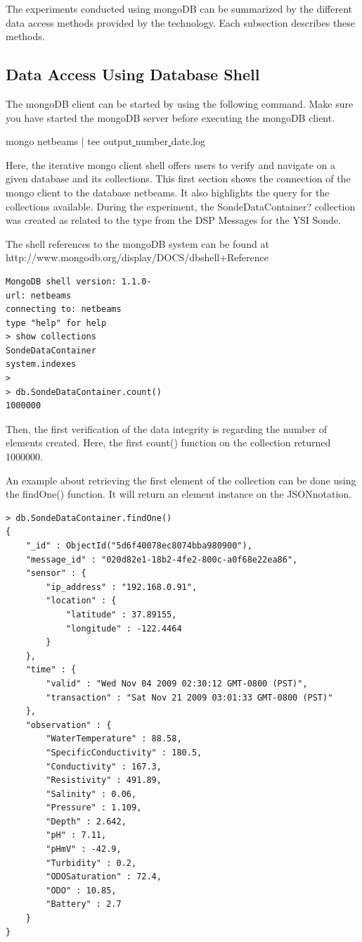 The experiments conducted using mongoDB can be summarized by the different
data access methods provided by the technology. Each subsection describes these
methods.

\subsection{Data Access Using Database Shell}
\label{sec:mongodb-user-experience}

The mongoDB client can be started by using the following command. Make sure you
have started the mongoDB server before executing the mongoDB client.

mongo netbeams | tee output\underline{ }number\underline{ }date.log

Here, the iterative mongo client shell offers users to verify and navigate on a
given database and its collections. This first section shows the connection of
the mongo client to the database netbeams. It also highlights the query for the
collections available. During the experiment, the SondeDataContainer?
collection was created as related to the type from the DSP Messages for the YSI
Sonde.

The shell references to the mongoDB system can be found at
http://www.mongodb.org/display/DOCS/dbshell+Reference 

\lstset{label=cmd:mongo,caption=Execution of mongo client}
\begin{lstlisting}
MongoDB shell version: 1.1.0-
url: netbeams
connecting to: netbeams
type "help" for help
> show collections
SondeDataContainer
system.indexes
>
> db.SondeDataContainer.count()
1000000
\end{lstlisting}

Then, the first verification of the data integrity is regarding the number of
elements created. Here, the first count() function on the collection returned
1000000.

An example about retrieving the first element of the collection can be done
using the findOne() function. It will return an element instance on the
JSONnotation.

\lstset{label=cmd:mongo-findone,caption=Querying the database: one item}
\begin{lstlisting}
> db.SondeDataContainer.findOne()
{
    "_id" : ObjectId("5d6f40078ec8074bba980900"),
    "message_id" : "020d82e1-18b2-4fe2-800c-a0f68e22ea86",
    "sensor" : {
        "ip_address" : "192.168.0.91",
        "location" : {
            "latitude" : 37.89155,
            "longitude" : -122.4464
        }
    },
    "time" : {
        "valid" : "Wed Nov 04 2009 02:30:12 GMT-0800 (PST)",
        "transaction" : "Sat Nov 21 2009 03:01:33 GMT-0800 (PST)"
    },
    "observation" : {
        "WaterTemperature" : 88.58,
        "SpecificConductivity" : 180.5,
        "Conductivity" : 167.3,
        "Resistivity" : 491.89,
        "Salinity" : 0.06,
        "Pressure" : 1.109,
        "Depth" : 2.642,
        "pH" : 7.11,
        "pHmV" : -42.9,
        "Turbidity" : 0.2,
        "ODOSaturation" : 72.4,
        "ODO" : 10.85,
        "Battery" : 2.7
    }
}
\end{lstlisting}

